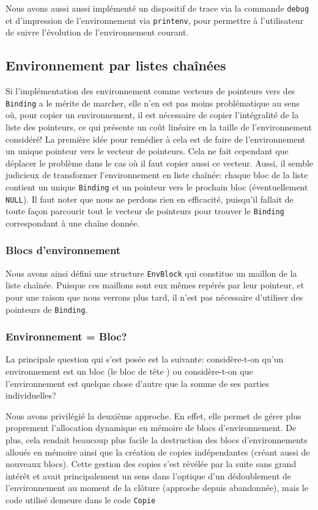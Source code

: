\documentclass[a4paper,11pt]{article}
\begin{document}
Nous avons aussi aussi implémenté un dispositif de trace via la commande 
\texttt{debug} et d'impression de l'environnement via \texttt{printenv}, 
pour permettre à l'utilisateur de suivre l'évolution de l'environnement courant.

\subsection{Environnement par listes chaînées}

Si l’implémentation des environnement comme vecteurs 
de pointeurs vers des \texttt{Binding} a le mérite de marcher, elle n'en est
pas moins problématique au sens où, pour copier un environnement, il est
nécessaire de copier l'intégralité de la liste des pointeurs, ce qui présente un
coût linéaire en la taille de l'environnement considéré!
La première idée pour remédier à cela est de faire de l'environnement un unique
pointeur vers le vecteur de pointeurs. Cela ne fait cependant que déplacer le
problème dans le cas où il faut copier aussi ce vecteur.
Aussi, il semble judicieux de transformer l’environnement en liste chaînée:
chaque bloc de la liste contient un unique \texttt{Binding} et un pointeur vers
le prochain bloc (éventuellement \texttt{NULL}). Il faut noter que nous ne perdons rien
en efficacité, puisqu'il fallait de toute façon parcourir tout le vecteur de
pointeurs pour trouver le \texttt{Binding} correspondant à une chaîne donnée.

\subsubsection{Blocs d’environnement}

Nous avons ainsi défini une structure \texttt{EnvBlock} qui constitue un maillon
de la liste chaînée. Puisque ces maillons sont eux mêmes repérés par leur
pointeur, et pour une raison que nous verrons plus tard, il n'est pas nécessaire
d'utiliser des pointeurs de \texttt{Binding}.

\subsubsection{Environnement = Bloc?}

La principale question qui s'est posée est la suivante: considère-t-on qu'un
environnement est un bloc (le bloc de \og tête \fg) ou considère-t-on que
l'environnement est quelque chose d'autre que la somme de ses
parties individuelles?

Nous avons privilégié la deuxième approche. En effet, elle permet de gérer plus
proprement l'allocation dynamique en mémoire de blocs d'environnement. De plus,
cela rendait beaucoup plus facile la destruction des blocs d'environnements
alloués en mémoire ainsi que la création de copies indépendantes (créant aussi
de nouveaux blocs). Cette gestion des copies s'est révélée par la suite sans
grand intérêt et avait principalement un sens dans l'optique d'un dédoublement
de l'environnement au moment de la clôture (approche depuis abandonnée), mais le
code utilisé demeure dans le code \texttt{Copie}
\end{document}
